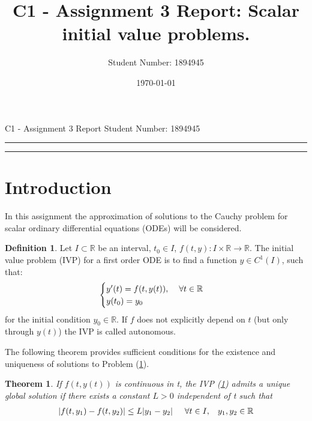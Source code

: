 \documentclass[11pt]{article}
\title{C1 - Assignment 3 Report: Scalar initial value problems.} %
\author{Student Number: 1894945} %
\date{\today} %
\theoremstyle{theorem}
\newtheorem{theorem}{Theorem}
\theoremstyle{definition}
\newtheorem{definition}{Definition}
\begin{document}
\maketitle %

\begin{center}
C1 - Assignment 3 Report \hfill
Student Number: 1894945
\vspace{3pt} \hrule \vspace{3pt} \hrule
\end{center}

\tableofcontents

\clearpage



\section{Introduction}
In this assignment the approximation of solutions to the Cauchy problem
for scalar ordinary differential equations (ODEs) will be considered.

\begin{definition}
	\label{def:Cauchy-prob}
	Let $I\subset\mathbb{R}$ be an interval, $t_0\in I$, $f(t,y):I\times\mathbb{R}\rightarrow\mathbb{R}$. The initial value problem (IVP) for a first order ODE is to find a function $y\in C^1(I)$, such that:
	\begin{align}
		\label{eqn:Cauchy-prob}
		\begin{cases}
		y'(t)=f(t,y(t)),\hspace{4mm}\forall t\in\mathbb{R}\\
		y(t_0)=y_0
		\end{cases}
	\end{align} 
	for the initial condition $y_0\in\mathbb{R}$. If $f$ does not explicitly depend on
	$t$ (but only through $y(t)$) the IVP is called autonomous.
\end{definition}

The following theorem provides sufficient conditions for the existence and uniqueness of solutions to Problem (\ref{def:Cauchy-prob}).\\

\begin{theorem}
	\label{thm:Picard}
	If $f(t,y(t))$ is continuous in t, the IVP (\ref{def:Cauchy-prob}) admits a unique global solution if there exists a constant $L>0$ independent of t such that
	\begin{align}
		\label{eqn:Lipschitz}
		|f(t,y_1)-f(t,y_2)|\le L|y_1-y_2|\hspace{5mm}\forall t\in I,\hspace{3mm} y_1,y_2\in\mathbb{R}
	\end{align}
\end{theorem}
\end{document}

